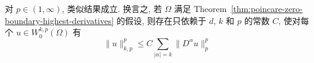 \begin{Remark}
\label{rem:poincare-general-p}
对 $p\in(1,\infty)$, 类似结果成立. 换言之, 若 $\Omega$ 满足 Theorem~\ref{thm:poincare-zero-boundary-highest-derivatives} 的假设, 则存在只依赖于 $d$, $k$ 和 $p$ 的常数 $C$, 使对每个 $u\in W_0^{k,p}(\Omega)$ 有
\begin{equation}\label{eq:poincare-zero-boundary-general-p}
\|u\|_{k,p}^p\leq C\sum_{|\alpha|=k}\|D^\alpha u\|_p^p
\end{equation}

\end{Remark}
